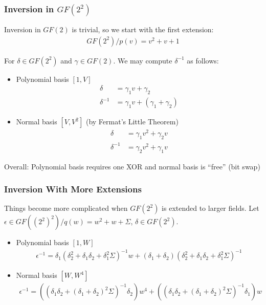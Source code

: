 \documentclass[10pt]{beamer}
\begin{document}
\begin{frame}
	\frametitle{Inversion in $GF(2^2)$}
	Inversion in $GF(2)$ is trivial, so we start with the first extension:
	\begin{align*}
		GF(2^2) / p(v) = v^2 + v + 1
	\end{align*}

	\medskip
	For $\delta \in GF(2^2)$ and $\gamma \in GF(2)$. We may compute $\delta^{-1}$ as follows:
	\pause
	\begin{itemize}
		\item Polynomial basis $[1, V]$
		\begin{align*}
			\delta & = \gamma_1 v + \gamma_2 \\
			\delta^{-1} & = \gamma_1 v + (\gamma_1 + \gamma_2)
		\end{align*}
		\pause
		\item Normal basis $[V, V^2]$ (by Fermat's Little Theorem)
		\begin{align*}
			\delta & = \gamma_1 v^2 + \gamma_2 v \\
			\delta^{-1} & = \gamma_2 v^2 + \gamma_1 v
		\end{align*}
	\end{itemize}

	\pause
	Overall: Polynomial basis requires one XOR and normal basis is ``free'' (bit swap)

\end{frame}

\begin{frame}
	\frametitle{Inversion With More Extensions}
	Things become more complicated when $GF(2^2)$ is extended to larger fields. Let $\epsilon \in GF((2^2)^2)/q(w) = w^2 + w + \Sigma$, $\delta \in GF(2^2)$.
	\pause
	\medskip
	\begin{itemize}
		\item Polynomial basis $[1, W]$
		\begin{align*}
			\epsilon^{-1} = \delta_1(\delta_2^2 + \delta_1\delta_2 + \delta_1^2\Sigma)^{-1}w + (\delta_1 + \delta_2)(\delta_2^2 + \delta_1\delta_2 + \delta_1^2\Sigma)^{-1}
		\end{align*}
		\pause
		\item Normal basis $[W, W^4]$
		\begin{align*}
			\epsilon^{-1} = ((\delta_1\delta_2 + (\delta_1 + \delta_2)^2\Sigma)^{-1}\delta_2) w^4 + ((\delta_1\delta_2 + (\delta_1 + \delta_2)^2\Sigma)^{-1}\delta_1) w
		\end{align*}
	\end{itemize}

\end{frame}
\end{document}
